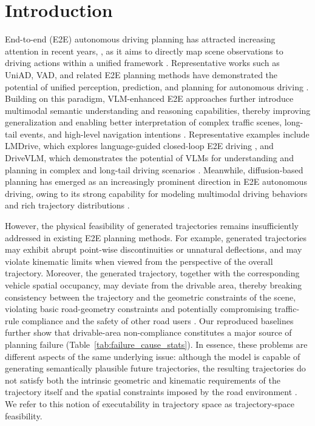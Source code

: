\documentclass[3p,times,authoryear]{elsarticle}
\begin{document}
\section{Introduction}

End-to-end (E2E) autonomous driving planning has attracted increasing attention in recent years, , as it aims to directly map scene observations to driving actions within a unified framework \citep{hu2023uniad}. Representative works such as UniAD, VAD, and related E2E planning methods have demonstrated the potential of unified perception, prediction, and planning for autonomous driving \citep{hu2023uniad,jiang2023vad}. Building on this paradigm, VLM-enhanced E2E approaches further introduce multimodal semantic understanding and reasoning capabilities, thereby improving generalization and enabling better interpretation of complex traffic scenes, long-tail events, and high-level navigation intentions \citep{lmdrive,tian2025drivevlm,autovla}. Representative examples include LMDrive, which explores language-guided closed-loop E2E driving \citep{lmdrive}, and DriveVLM, which demonstrates the potential of VLMs for understanding and planning in complex and long-tail driving scenarios \citep{tian2025drivevlm}. Meanwhile, diffusion-based planning has emerged as an increasingly prominent direction in E2E autonomous driving, owing to its strong capability for modeling multimodal driving behaviors and rich trajectory distributions \citep{zheng2025diffusionplanner,liao2025diffusiondrive}.  

However, the physical feasibility of generated trajectories remains insufficiently addressed in existing E2E planning methods. For example, generated trajectories may exhibit abrupt point-wise discontinuities or unnatural deflections, and may violate kinematic limits when viewed from the perspective of the overall trajectory. Moreover, the generated trajectory, together with the corresponding vehicle spatial occupancy, may deviate from the drivable area, thereby breaking consistency between the trajectory and the geometric constraints of the scene, violating basic road-geometry constraints and potentially compromising traffic-rule compliance and the safety of other road users \citep{dauner2024navsim}. Our reproduced baselines further show that drivable-area non-compliance constitutes a major source of planning failure (Table~\ref{tab:failure_cause_stats}). In essence, these problems are different aspects of the same underlying issue: although the model is capable of generating semantically plausible future trajectories, the resulting trajectories do not satisfy both the intrinsic geometric and kinematic requirements of the trajectory itself and the spatial constraints imposed by the road environment \citep{katrakazas2015motionplanning,song2023motionplanningcontrol,rahman2025trajectory}. We refer to this notion of executability in trajectory space as trajectory-space feasibility.
\end{document}
